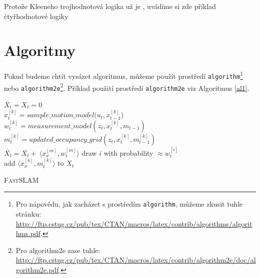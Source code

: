 \documentclass[a4paper, 11pt]{article}
\begin{document}
\begin{table}[ht]
    \caption{Protože Kleeneho trojhodnotová logika už je , uvádíme si zde příklad čtyřhodnotové logiky}
    \label{tab:tab2}
\end{table}

\enlargethispage{-50pt}
\newpage

\section{Algoritmy}
\label{sec:3}

Pokud budeme chtít vysázet algoritmus, můžeme použít prostředí \texttt{algorithm}\footnote{\raggedright Pro nápovědu, jak zacházet s prostředím \texttt{algorithm}, můžeme zkusit tuhle stránku: \href{http://ftp.cstug.cz/pub/tex/CTAN/macros/latex/contrib/algorithms/algorithms.pdf}{http://ftp.cstug.cz/pub/tex/CTAN/macros/latex/contrib/algorithms/algorithms.pdf}.} nebo \texttt{algorithm2e}\footnote{Pro algorithm2e zase tuhle: \href{http://ftp.cstug.cz/pub/tex/CTAN/macros/latex/contrib/algorithm2e/doc/algorithm2e.pdf}{http://ftp.cstug.cz/pub/tex/CTAN/macros/latex/contrib/algorithm2e/doc/algorithm2e.pdf}.}. Příklad použití prostředí \texttt{algorithm2e} viz Algoritmus \ref{al1}.

\bigskip

\begin{algorithm} [H]
    \label{al1}
    \DontPrintSemicolon
    
    
    \medskip
    
    \SetNlSty{}{}{:}
    \SetNlSkip{-1em}
    \Indp
    \Indpp
    
    $\overline{X_t}=X_t=0$\\
    {
        $x_t^{[k]}=sample\_motion\_model(u_t,x_{t-1}^{[k]}$)\\
        $w_t^{[k]}=measurement\_model(z_t,x_t^{[k]},m_{t-1})$\\
        $m_t^{[k]}=updated\_occupancy\_grid(z_t,x_t^{[k]},m_{t-1}^{[k]})$\\
        $\overline{X_t}=\overline{X_t}+\ \langle x_x^{[m]},w_t^{[m]} \rangle$
    }
    {
        draw $i$ with probability $\approx w_t^{[i]}$\\
        add $\langle x_x^{[k]},m_t^{[k]}\rangle$ to $X_t$
    }
    \caption{\textsc{FastSLAM}}
\end{algorithm}
\bigskip
\end{document}
